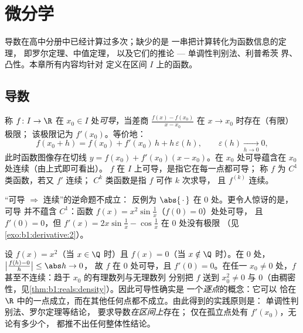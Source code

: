 \chapter{微分学}\label{ch:b1:derivative}

导数在高中分册中已经计算过多次；缺少的是
一串把计算转化为函数信息的定理，
即罗尔定理、中值定理，
以及它们的推论 --- 单调性判别法、利普希茨 界、
凸性。本章所有内容均针对
定义在区间 $I$ 上的函数。

\section{导数}

\begin{definition}\label{def:b1:derivative:def}
称 $f \colon I \to \R$ 在 $x_0 \in
I$ 处\emph{可导}，当差商
$\frac{f(x) - f(x_0)}{x - x_0}$ 在 $x \to x_0$ 时存在（有限）极限；
该极限记为 $f'(x_0)$。等价地：
\[
f(x_0 + h) = f(x_0) + f'(x_0)\,h + h\,\varepsilon(h),
\qquad \varepsilon(h) \xrightarrow[h \to 0]{} 0 ,
\]
此时函数图像存在切线 $y = f(x_0) + f'(x_0)(x -
x_0)$。在 $x_0$ 处可导蕴含在 $x_0$ 处连续（由上式即可看出）。
$f$ 在 $I$ 上可导，是指它在每一点都可导；
称 $f$ 为 $C^1$ 类函数，若又 $f'$ 连续；
$C^k$ 类函数是指 $f$ 可作 $k$ 次求导，
且 $f^{(k)}$ 连续。
\end{definition}

\begin{example}\label{ex:b1:derivative:notc1}
“可导 $\Rightarrow$ 连续”的逆命题不成立：
反例为 $\abs{\,\cdot\,}$ 在 $0$ 处。更令人惊讶的是，可导
并不蕴含 $C^1$：函数 $f(x) = x^2 \sin\frac 1x$（$f(0) = 0$）处处可导，
且 $f'(0) = 0$，但 $f'(x) = 2x
\sin\frac1x - \cos\frac 1x$ 在 $0$ 处没有极限
（见\cref{exo:b1:derivative:2}）。
\end{example}

\begin{example}[恰在一点可导]\label{ex:b1:derivative:onepoint}
设 $f(x) = x^2$（当 $x \in \Q$ 时）且 $f(x) = 0$（当 $x \notin
\Q$ 时）。在 $0$ 处，$\bigl|\frac{f(h) - 0}{h}\bigr| \leq \abs h \to 0$，
故 $f$ 在 $0$ 处可导，且 $f'(0) = 0$。在任一 $x_0
\neq 0$ 处，$f$ 甚至不连续：趋于 $x_0$ 的有理数列与无理数列
分别把 $f$ 送到 $x_0^2 \neq 0$ 与
$0$（由稠密性，见\cref{thm:b1:reals:density}）。因此可导性确实是
一个\emph{逐点}的概念：它可以
恰在 $\R$ 中的一点成立，而在其他任何点都不成立。由此得到的实践原则是：
单调性判别法、罗尔定理等结论，
要求导数\emph{在区间上}存在；
仅在孤立点处有 $f'(x_0)$，无论有多少个，
都推不出任何整体性结论。
\end{example}

